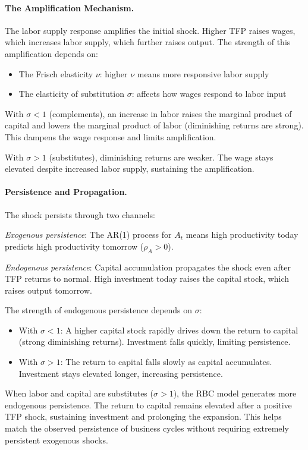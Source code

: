\paragraph{The Amplification Mechanism.}
The labor supply response amplifies the initial shock. Higher TFP raises wages, which increases labor supply, which further raises output. The strength of this amplification depends on:
\begin{itemize}[nosep]
\item The Frisch elasticity $\nu$: higher $\nu$ means more responsive labor supply
\item The elasticity of substitution $\sigma$: affects how wages respond to labor input
\end{itemize}

With $\sigma < 1$ (complements), an increase in labor raises the marginal product of capital and lowers the marginal product of labor (diminishing returns are strong). This dampens the wage response and limits amplification.

With $\sigma > 1$ (substitutes), diminishing returns are weaker. The wage stays elevated despite increased labor supply, sustaining the amplification.

\paragraph{Persistence and Propagation.}
The shock persists through two channels:

\textit{Exogenous persistence}: The AR(1) process for $A_t$ means high productivity today predicts high productivity tomorrow ($\rho_A > 0$).

\textit{Endogenous persistence}: Capital accumulation propagates the shock even after TFP returns to normal. High investment today raises the capital stock, which raises output tomorrow.

The strength of endogenous persistence depends on $\sigma$:
\begin{itemize}[nosep]
\item With $\sigma < 1$: A higher capital stock rapidly drives down the return to capital (strong diminishing returns). Investment falls quickly, limiting persistence.
\item With $\sigma > 1$: The return to capital falls slowly as capital accumulates. Investment stays elevated longer, increasing persistence.
\end{itemize}

\begin{calloutimportant}
When labor and capital are substitutes ($\sigma > 1$), the RBC model generates more endogenous persistence. The return to capital remains elevated after a positive TFP shock, sustaining investment and prolonging the expansion. This helps match the observed persistence of business cycles without requiring extremely persistent exogenous shocks.
\end{calloutimportant}

